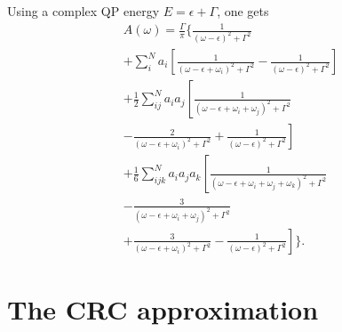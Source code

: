 \documentclass[a4paper,12pt]{article}
\begin{document}
Using a complex QP energy $E=\epsilon+\Gamma$, one gets
\begin{multline}
 A(\omega) = \frac{\Gamma}\pi \Biggl\{ \frac1{(\omega-\epsilon)^2+\Gamma^2} \\
 + \sum_i^N a_i \left[ \frac1{(\omega- \epsilon + \omega_i)^2 + \Gamma^2} 
  - \frac1{(\omega-\epsilon)^2+\Gamma^2} \right] \\
  + \frac12 \sum_{ij}^N a_i a_j \left[ 
   \frac1{(\omega - \epsilon + \omega_i + \omega_j)^2 + \Gamma^2 } \right. \\ 
 \left. - \frac2{(\omega- \epsilon + \omega_i)^2 + \Gamma^2} 
  + \frac1{(\omega-\epsilon)^2+\Gamma^2} \right] \\ 
  + \frac16 \sum_{ijk}^N a_i a_j a_k 
   \left[ \frac1{(\omega - \epsilon + \omega_i + \omega_j + \omega_k)^2 + \Gamma^2}  \right. \\ 
   \left. - \frac3{(\omega - \epsilon + \omega_i + \omega_j)^2 + \Gamma^2} \right. \\ 
   \left.  + \frac3{(\omega - \epsilon + \omega_i)^2 + \Gamma^2 } 
   - \frac1{(\omega-\epsilon)^2+\Gamma^2}  \right] \Biggr\} .
\end{multline}


\section{The CRC approximation}
\end{document}
